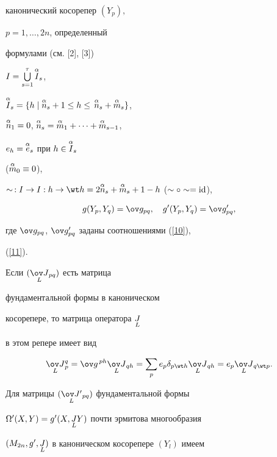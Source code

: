 канонический косорепер $(Y_p),$


$p=1,\dotsc ,2n$, определенный


формулами (см. [2], [3])


$I=\bigcup \limits_{s=1}^{\tau} \overset{\alpha}{I}_s$,


$\up{\alpha}{I}_s=\{ h\mid


\up{\alpha}{n}_s+1\le h\le\, \up{\alpha}{n}_s+


\up{\alpha}{m}_s \}$,


$\up{\alpha}{n}_1=0$, $\up{\alpha}{n}_s=


\up{\alpha}{m}_1+ \dotsb +\up{\alpha}{m}_{s-1}$,


$e_h =\overset{\alpha}{e}_s$ при $h\in \overset{\alpha}{I}_s$


($\overset{\alpha}{m}_0\equiv 0$),


$\sim\, :I\to I:h\to \wt h=2\up{\alpha}{n}_s


+\up{\alpha}{m}_s+1-h$ ($\sim \circ \sim =\id$),


\begin{equation}\label{12}


g(Y_p,Y_q)=\ov g_{pq},\quad g'(Y_p,Y_q)=\ov g'_{pq},


\end{equation}


где $\ov g_{pq}$, $\ov g'_{pq}$ заданы соотношениями (\ref{10}),


(\ref{11}).





Если $({\down{L}{\ov J}}{}_{pq})$ есть матрица


фундаментальной формы в каноническом


косорепере, то матрица оператора $\underset{L}{J}$


в этом репере имеет вид


$$


\label{16}


{\down{L}{\ov J}}{}_p^q=\ov g^{\,ph}{\down{L}{\ov J}}{}_{qh}=\sum_p e_p


\delta_{p\wt h}{\down{L}{\ov J}}{}_{qh}=e_p{\down{L}{\ov J}}{}_{q \wt p}.


$$


Для матрицы $({\down{L}{\ov J'}}{}_{pq})$ фундаментальной формы


$\Omega'(X,Y)=g'(X,\underset{L}{J}Y)$ почти эрмитова многообразия


$(M_{2n},g',\underset{L}{J})$ в каноническом косорепере $(Y_l)$ имеем


